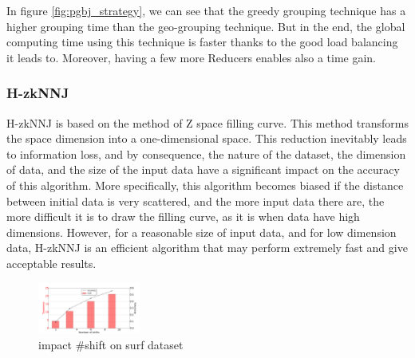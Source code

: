          In figure \ref{fig:pgbj_strategy}, we can see that the greedy grouping technique has a higher grouping time than the geo-grouping technique. But in the end, the global computing time using this technique is faster thanks to the good load balancing it leads to. Moreover, having a few more Reducers enables also a time gain.
        
        
\subsubsection{H-zkNNJ}\label{z-value}
H-zkNNJ is based on the method of Z space filling curve. This method transforms the space dimension into a one-dimensional space.
This reduction inevitably leads to information loss, and by consequence, the nature of the dataset, the dimension of data, and the size of the input data have a significant impact on the accuracy of this algorithm.
More specifically, this algorithm becomes biased if the distance between initial data is very scattered, and the more input data there are, the more difficult it is to draw the filling curve, as it is when data have high dimensions.
However, for a reasonable size of input data, and for low dimension data, H-zkNNJ is an efficient algorithm that may perform extremely fast and give acceptable results.

\begin{figure}[!h]
\centering
                \includegraphics[width=0.3\textwidth]{img-perf/perso/hzknnj/shift.pdf}
                \caption{impact \#shift on surf dataset  }
                \label{fig:shift_dataset}
\end{figure}

